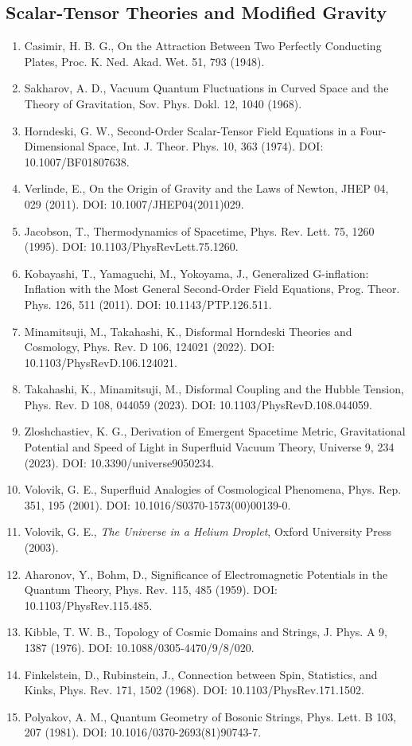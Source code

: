 \documentclass[12pt,oneside]{book}
\begin{document}
\subsection{Scalar-Tensor Theories and Modified Gravity}

\begin{enumerate}
    \item Casimir, H. B. G., On the Attraction Between Two Perfectly Conducting Plates, Proc. K. Ned. Akad. Wet. 51, 793 (1948).
    \item Sakharov, A. D., Vacuum Quantum Fluctuations in Curved Space and the Theory of Gravitation, Sov. Phys. Dokl. 12, 1040 (1968).
    \item Horndeski, G. W., Second-Order Scalar-Tensor Field Equations in a Four-Dimensional Space, Int. J. Theor. Phys. 10, 363 (1974). DOI: 10.1007/BF01807638.
    \item Verlinde, E., On the Origin of Gravity and the Laws of Newton, JHEP 04, 029 (2011). DOI: 10.1007/JHEP04(2011)029.
    \item Jacobson, T., Thermodynamics of Spacetime, Phys. Rev. Lett. 75, 1260 (1995). DOI: 10.1103/PhysRevLett.75.1260.
    \item Kobayashi, T., Yamaguchi, M., Yokoyama, J., Generalized G-inflation: Inflation with the Most General Second-Order Field Equations, Prog. Theor. Phys. 126, 511 (2011). DOI: 10.1143/PTP.126.511.
    \item Minamitsuji, M., Takahashi, K., Disformal Horndeski Theories and Cosmology, Phys. Rev. D 106, 124021 (2022). DOI: 10.1103/PhysRevD.106.124021.
    \item Takahashi, K., Minamitsuji, M., Disformal Coupling and the Hubble Tension, Phys. Rev. D 108, 044059 (2023). DOI: 10.1103/PhysRevD.108.044059.
    \item Zloshchastiev, K. G., Derivation of Emergent Spacetime Metric, Gravitational Potential and Speed of Light in Superfluid Vacuum Theory, Universe 9, 234 (2023). DOI: 10.3390/universe9050234.
    \item Volovik, G. E., Superfluid Analogies of Cosmological Phenomena, Phys. Rep. 351, 195 (2001). DOI: 10.1016/S0370-1573(00)00139-0.
    \item Volovik, G. E., \textit{The Universe in a Helium Droplet}, Oxford University Press (2003).
    \item Aharonov, Y., Bohm, D., Significance of Electromagnetic Potentials in the Quantum Theory, Phys. Rev. 115, 485 (1959). DOI: 10.1103/PhysRev.115.485.
    \item Kibble, T. W. B., Topology of Cosmic Domains and Strings, J. Phys. A 9, 1387 (1976). DOI: 10.1088/0305-4470/9/8/020.
    \item Finkelstein, D., Rubinstein, J., Connection between Spin, Statistics, and Kinks, Phys. Rev. 171, 1502 (1968). DOI: 10.1103/PhysRev.171.1502.
    \item Polyakov, A. M., Quantum Geometry of Bosonic Strings, Phys. Lett. B 103, 207 (1981). DOI: 10.1016/0370-2693(81)90743-7.
\end{enumerate}
\end{document}
